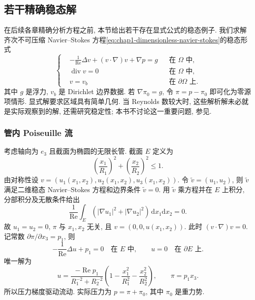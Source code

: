\subsection{若干精确稳态解}
\label{sec:chap1-exact-steady-solutions}

在后续各章精确分析方程之前, 本节给出若干存在显式公式的稳态例子. 我们求解齐次不可压缩 Navier--Stokes 方程\eqref{eq:chap1-dimensionless-navier-stokes}的稳态形式
\begin{equation}
\label{eq:chap1-steady-dirichlet-system}
\left\{\begin{aligned}
&-\frac1{\operatorname{Re}}\Delta v+(v\cdot\nabla)v+\nabla p=g&&\text{在 $\Omega$ 中},\\
&\operatorname{div}v=0&&\text{在 $\Omega$ 中},\\
&v=v_b&&\text{在 $\partial\Omega$ 上}.
\end{aligned}\right.
\end{equation}
其中 $g$ 是浮力, $v_b$ 是 Dirichlet 边界数据. 若 $\nabla\pi_0=g$, 令 $\pi=p-\pi_0$ 即可化为零源项情形. 显式解要求区域具有简单几何. 当 Reynolds 数较大时, 这些解析解未必就是实际观察到的解, 还需研究稳定性; 本书不讨论这一重要问题, 参见.

\subsubsection{管内 Poiseuille 流}
\label{subsec:chap1-poiseuille-flow}

考虑轴向为 $e_3$ 且截面为椭圆的无限长管. 截面 $E$ 定义为
\begin{equation}
\label{eq:chap1-elliptic-pipe-section}
  \left(\frac{x_1}{R_1}\right)^2+\left(\frac{x_2}{R_2}\right)^2\leq1.
\end{equation}
由对称性设 $v=(u_1(x_1,x_2),u_2(x_1,x_2),u_3(x_1,x_2))$. 令 $\widetilde v=(u_1,u_2)$, 则 $\widetilde v$ 满足二维稳态 Navier--Stokes 方程和边界条件 $\widetilde v=0$. 用 $\widetilde v$ 乘方程并在 $E$ 上积分, 分部积分及无散条件给出
\[
  \frac1{\operatorname{Re}}\int_E(|\nabla u_1|^2+|\nabla u_2|^2)\,\mathrm{d}x_1\mathrm{d}x_2=0.
\]
故 $u_1=u_2=0$, $\pi$ 与 $x_1,x_2$ 无关, 且 $v=(0,0,u(x_1,x_2))$. 此时 $(v\cdot\nabla)v=0$. 记常数 $\partial\pi/\partial x_3=p_1$, 则
\[
  -\frac1{\operatorname{Re}}\Delta u+p_1=0\quad\text{在 $E$ 中},
  \qquad u=0\quad\text{在 $\partial E$ 上}.
\]
唯一解为
\[
u=\frac{-\operatorname{Re}p_1}{R_1^{-2}+R_2^{-2}}
\left(1-\frac{x_1^2}{R_1^2}-\frac{x_2^2}{R_2^2}\right),
\qquad \pi=p_1x_3.
\]
所以压力梯度驱动流动. 实际压力为 $p=\pi+\pi_0$, 其中 $\pi_0$ 是重力势.

